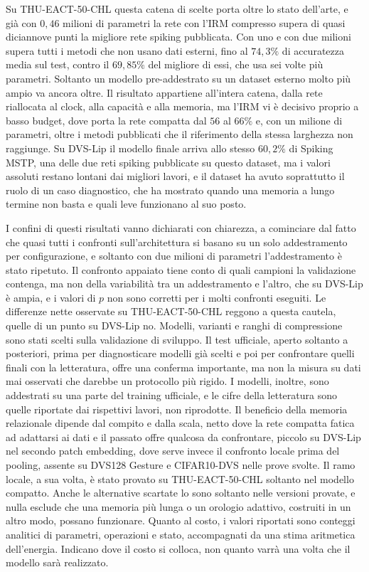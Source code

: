 Su THU-EACT-50-CHL questa catena di scelte porta oltre lo stato dell'arte, e già con $0{,}46$ milioni di parametri la rete con l'IRM compresso supera di quasi diciannove punti la migliore rete spiking pubblicata. Con uno e con due milioni supera tutti i metodi che non usano dati esterni, fino al $74{,}3\%$ di accuratezza media sul test, contro il $69{,}85\%$ del migliore di essi, che usa sei volte più parametri. Soltanto un modello pre-addestrato su un dataset esterno molto più ampio va ancora oltre. Il risultato appartiene all'intera catena, dalla rete riallocata al clock, alla capacità e alla memoria, ma l'IRM vi è decisivo proprio a basso budget, dove porta la rete compatta dal $56$ al $66\%$ e, con un milione di parametri, oltre i metodi pubblicati che il riferimento della stessa larghezza non raggiunge. Su DVS-Lip il modello finale arriva allo stesso $60{,}2\%$ di Spiking MSTP, una delle due reti spiking pubblicate su questo dataset, ma i valori assoluti restano lontani dai migliori lavori, e il dataset ha avuto soprattutto il ruolo di un caso diagnostico, che ha mostrato quando una memoria a lungo termine non basta e quali leve funzionano al suo posto.

I confini di questi risultati vanno dichiarati con chiarezza, a cominciare dal fatto che quasi tutti i confronti sull'architettura si basano su un solo addestramento per configurazione, e soltanto con due milioni di parametri l'addestramento è stato ripetuto. Il confronto appaiato tiene conto di quali campioni la validazione contenga, ma non della variabilità tra un addestramento e l'altro, che su DVS-Lip è ampia, e i valori di $p$ non sono corretti per i molti confronti eseguiti. Le differenze nette osservate su THU-EACT-50-CHL reggono a questa cautela, quelle di un punto su DVS-Lip no. Modelli, varianti e ranghi di compressione sono stati scelti sulla validazione di sviluppo. Il test ufficiale, aperto soltanto a posteriori, prima per diagnosticare modelli già scelti e poi per confrontare quelli finali con la letteratura, offre una conferma importante, ma non la misura su dati mai osservati che darebbe un protocollo più rigido. I modelli, inoltre, sono addestrati su una parte del training ufficiale, e le cifre della letteratura sono quelle riportate dai rispettivi lavori, non riprodotte. Il beneficio della memoria relazionale dipende dal compito e dalla scala, netto dove la rete compatta fatica ad adattarsi ai dati e il passato offre qualcosa da confrontare, piccolo su DVS-Lip nel secondo patch embedding, dove serve invece il confronto locale prima del pooling, assente su DVS128 Gesture e CIFAR10-DVS nelle prove svolte. Il ramo locale, a sua volta, è stato provato su THU-EACT-50-CHL soltanto nel modello compatto. Anche le alternative scartate lo sono soltanto nelle versioni provate, e nulla esclude che una memoria più lunga o un orologio adattivo, costruiti in un altro modo, possano funzionare. Quanto al costo, i valori riportati sono conteggi analitici di parametri, operazioni e stato, accompagnati da una stima aritmetica dell'energia. Indicano dove il costo si colloca, non quanto varrà una volta che il modello sarà realizzato.

